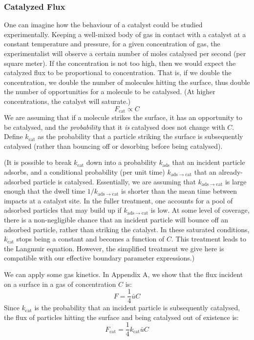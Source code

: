 \documentclass[12pt, a4paper, twoside, openright]{book}
\newcommand{\Fcat}{\ensuremath{F_{\mathrm{cat}}}}
\newcommand{\kcat}{\ensuremath{k_{\mathrm{cat}}}}
\newcommand{\kads}{\ensuremath{k_{\mathrm{ads}}}}
\newcommand{\kadscat}{\ensuremath{k_{\mathrm{ads \to cat}}}}
\begin{document}
\subsubsection{Catalyzed Flux}

One can imagine how the behaviour of a catalyst could be studied experimentally.
Keeping a well-mixed body of gas in contact with a catalyst at a constant temperature and pressure, for a given concentration of gas, the experimentalist will observe a certain number of moles catalysed per second (per square meter).  If the concentration is not too high, then we would expect the catalyzed flux to be proportional to concentration. That is, if we double the concentration, we double the number of molecules hitting the surface, thus double the number of opportunities for a molecule to be catalysed.  (At higher concentrations, the catalyst will saturate.)
\begin{equation}
\Fcat \propto C 
\end{equation}
We are assuming that if a molecule strikes the surface, it has an opportunity to be catalysed, and the \emph{probability} that it \emph{is} catalysed does not change with $C$.  Define $\kcat$ as the probability that a particle striking the surface is subsequently catalysed (rather than bouncing off or desorbing before being catalysed).

(It is possible to break $\kcat$ down into a probability $\kads$ that an incident particle adsorbs, and a conditional probability (per unit time) $\kadscat$ that an already-adsorbed particle is catalysed. Essentially, we are assuming that $\kadscat$ is large enough that the dwell time $1/ \kadscat$ is shorter than the mean time between impacts at a catalyst site. In the fuller treatment, one accounts for a pool of adsorbed particles that may build up if $\kadscat$ is low.
At some level of coverage, there is a non-negligible chance that an incident particle will bounce off an adsorbed particle, rather than striking the catalyst.  In these saturated conditions, $\kcat$ stops being a constant and becomes a function of $C$.
This treatment leads to the Langmuir equation.  However, the simplified treatment we give here is compatible with our effective boundary parameter expressions.)

We can apply some gas kinetics.  In Appendix A, we show that the flux incident on a surface in a gas of concentration $C$ is:
\begin{equation}
F = \frac{1}{4} \bar{u} C
\end{equation}
Since $\kcat$ is the probability that an incident particle is subsequently catalysed, the flux of particles hitting the surface and being catalysed out of existence is:
\begin{equation}
\Fcat = \frac{1}{4} \kcat \bar{u} C
\end{equation}
\end{document}
